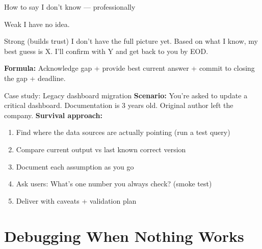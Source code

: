 \documentclass[aspectratio=169, 11pt]{beamer}
\begin{document}
	\begin{frame}{How to say   I don't know  — professionally}
		\begin{block}{Weak}
			  I have no idea.  
		\end{block}
		\begin{block}{Strong (builds trust)}
			 I don't have the full picture yet. Based on what I know, my best guess is X. I'll confirm with Y and get back to you by EOD.  
		\end{block}
		\textbf{Formula:} Acknowledge gap + provide best current answer + commit to closing the gap + deadline.
	\end{frame}
	
	\begin{frame}{Case study: Legacy dashboard migration}
		\textbf{Scenario:} You're asked to update a critical dashboard. Documentation is 3 years old. Original author left the company.
		\vspace{0.3cm}
		\textbf{Survival approach:}
		\begin{enumerate}
			\item Find where the data sources are actually pointing (run a test query)
			\item Compare current output vs last known correct version
			\item Document each assumption as you go
			\item Ask users:   What's one number you always check?  (smoke test)
			\item Deliver with caveats + validation plan
		\end{enumerate}
	\end{frame}
	
	
	\section{Debugging When Nothing Works}
	
\end{document}
